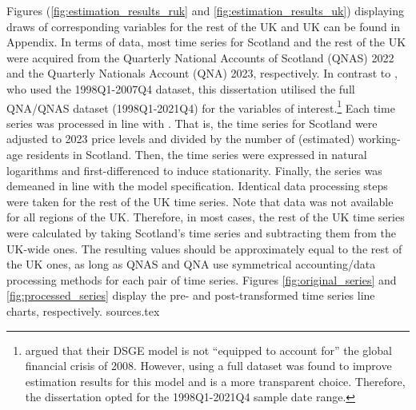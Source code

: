 Figures (\ref{fig:estimation_results_ruk} and \ref{fig:estimation_results_uk}) displaying draws of corresponding variables for the rest of the UK and UK can be found in Appendix. In terms of data, most time series for Scotland and the rest of the UK were acquired from the Quarterly National Accounts of Scotland (QNAS) 2022 and the Quarterly Nationals Account (QNA) 2023, respectively. In contrast to \textcite{ricci_2019_essays}, who used the 1998Q1-2007Q4 dataset, this dissertation utilised the full QNA/QNAS dataset (1998Q1-2021Q4) for the variables of interest.\footnote{\textcite{ricci_2019_essays} argued that their DSGE model is not ``equipped to account for''\parencite[123]{ricci_2019_essays} the global financial crisis of 2008. However, using a full dataset was found to improve estimation results for this model and is a more transparent choice. Therefore, the dissertation opted for the 1998Q1-2021Q4 sample date range.} Each time series was processed in line with \textcite{pfeifer_2018_a}. That is, the time series for Scotland were adjusted to 2023 price levels and divided by the number of (estimated) working-age residents in Scotland. Then, the time series were expressed in natural logarithms and first-differenced to induce stationarity. Finally, the series was demeaned in line with the model specification. Identical data processing steps were taken for the rest of the UK time series. Note that data was not available for all regions of the UK. Therefore, in most cases, the rest of the UK time series were calculated by taking Scotland's time series and subtracting them from the UK-wide ones. The resulting values should be approximately equal to the rest of the UK ones, as long as QNAS and QNA use symmetrical accounting/data processing methods for each pair of time series. Figures \ref{fig:original_series} and \ref{fig:processed_series} display the pre- and post-transformed time series line charts, respectively.
{sources.tex}